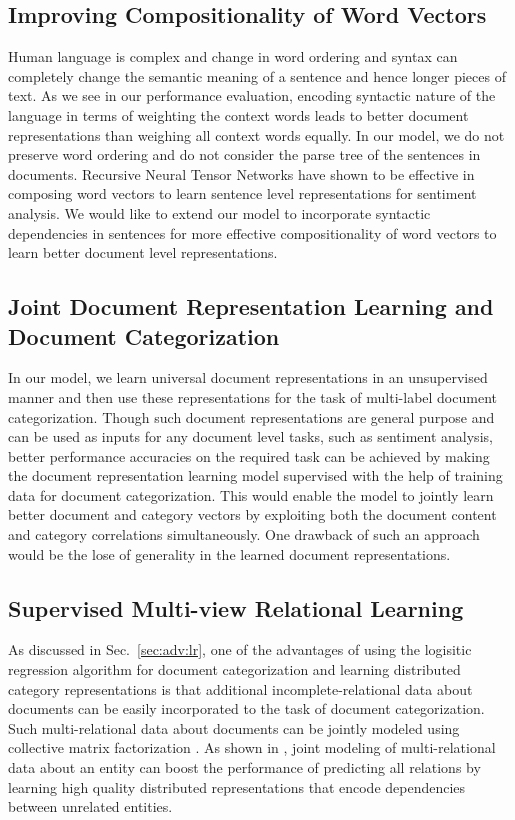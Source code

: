 \subsection{Improving Compositionality of Word Vectors}
Human language is complex and change in word ordering and syntax can completely change the semantic meaning of a sentence and hence longer pieces of text. 
As we see in our performance evaluation, encoding syntactic nature of the language in terms of weighting the context words leads to better document representations than weighing all context words equally. 
In our model, we do not preserve word ordering and do not consider the parse tree of the sentences in documents. 
Recursive Neural Tensor Networks \citep{socher2013recursive} have shown to be effective in composing word vectors to learn sentence level representations for sentiment analysis. 
We would like to extend our model to incorporate syntactic dependencies in sentences for more effective compositionality of word vectors to learn better document level representations.

\subsection{Joint Document Representation Learning and Document Categorization}
In our model, we learn universal document representations in an unsupervised manner and then use these representations for the task of multi-label document categorization. 
Though such document representations are general purpose and can be used as inputs for any document level tasks, such as sentiment analysis, better performance accuracies on the required task can be achieved by making the document representation learning model supervised with the help of training data for document categorization. 
This would enable the model to jointly learn better document and category vectors by exploiting both the document content and category correlations simultaneously.
One drawback of such an approach would be the lose of generality in the learned document representations.

\subsection{Supervised Multi-view Relational Learning}
As discussed in Sec.~\ref{sec:adv:lr}, one of the advantages of using the logisitic regression algorithm for document categorization and learning distributed category representations is that additional incomplete-relational data about documents can be easily incorporated to the task of document categorization. Such multi-relational data about documents can be jointly modeled using collective matrix factorization \cite{singh2008relational}. 
As shown in \citet{gupta2015collectively}, joint modeling of multi-relational data about an entity can boost the performance of predicting all relations by learning high quality distributed representations that encode dependencies between unrelated entities. 
